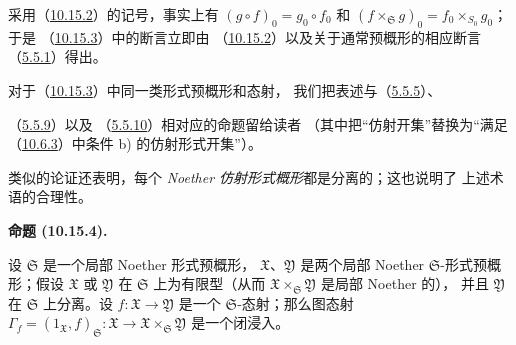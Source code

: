 \documentclass[UTF8,fontset=none,11pt,oneside,openany]{ctexbook}
\newenvironment{proposition}[1][]{%
  \par\medskip\noindent\textbf{命题 (#1).}\ %
}{\par}
\newcommand{\oldpage}[2][]{%
  \hypertarget{ega-source-page-#1-#2}{}%
  \marginnote{\scriptsize\textbf{#1}~|~#2}\ignorespaces}
\let\EGAOriginalLabel\label
\renewcommand{\label}[1]{\phantomsection\EGAOriginalLabel{#1}}
\begin{document}
采用（\hyperref[I.10.15.2-fr]{10.15.2}）的记号，事实上有
$(g\circ f)_0=g_0\circ f_0$ 和
$(f\times_{\mathfrak{S}}g)_0=f_0\times_{S_0}g_0$；于是
（\hyperref[I.10.15.3-fr]{10.15.3}）中的断言立即由
（\hyperref[I.10.15.2-fr]{10.15.2}）以及关于通常预概形的相应断言
（\hyperref[I.5.5.1-fr]{5.5.1}）得出。

对于（\hyperref[I.10.15.3-fr]{10.15.3}）中同一类形式预概形和态射，
我们把表述与（\hyperref[I.5.5.5-fr]{5.5.5}）、

\oldpage[I]{213}
（\hyperref[I.5.5.9-fr]{5.5.9}）以及
（\hyperref[I.5.5.10-fr]{5.5.10}）相对应的命题留给读者
（其中把“仿射开集”替换为“满足
（\hyperref[I.10.6.3-fr]{10.6.3}）中条件 b) 的仿射形式开集”）。

类似的论证还表明，每个 \emph{Noether 仿射形式概形}都是分离的；这也说明了
上述术语的合理性。

\begin{proposition}[10.15.4]
\label{I.10.15.4-fr}
设 $\mathfrak{S}$ 是一个局部 Noether 形式预概形，
$\mathfrak{X}$、$\mathfrak{Y}$ 是两个局部 Noether
$\mathfrak{S}$-形式预概形；假设 $\mathfrak{X}$ 或 $\mathfrak{Y}$ 在
$\mathfrak{S}$ 上为有限型（从而
$\mathfrak{X}\times_{\mathfrak{S}}\mathfrak{Y}$ 是局部 Noether 的），
并且 $\mathfrak{Y}$ 在 $\mathfrak{S}$ 上分离。设
$f:\mathfrak{X}\to\mathfrak{Y}$ 是一个 $\mathfrak{S}$-态射；那么图态射
$\Gamma_f=(1_{\mathfrak{X}},f)_{\mathfrak{S}}:\mathfrak{X}\to
\mathfrak{X}\times_{\mathfrak{S}}\mathfrak{Y}$ 是一个闭浸入。
\end{proposition}
\end{document}
